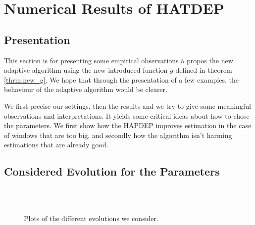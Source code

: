\documentclass[11pt]{book}
\begin{document}

\chapter{Numerical Results of HATDEP}

\section{Presentation}
This section is for presenting some empirical observations à propos the new adaptive algorithm using the new introduced function $g$ defined in theorem \ref{thrm:new_g}. We hope that through the presentation of a few examples, the behaviour of the adaptive algorithm would be clearer. 

We first precise our settings, then the results and we try to give some meaningful observations and interpretations. It yields some critical ideas about how to chose the parameters. We first show how the HAPDEP improves estimation in the case of windows that are too big, and secondly how the algorithm isn't harming estimations that are already good.

\section{Considered Evolution for the Parameters}
\begin{figure}
\centering
{}
\\
\\
\caption{Plots of the different evolutions we consider.}
\label{fig:evol_functions}
\end{figure}
\end{document}
